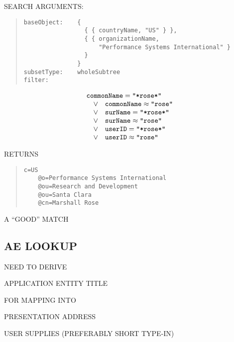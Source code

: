 \begin{bwslide}

\begin{nrtc}
\item	SEARCH ARGUMENTS:
\begin{quote}\small\begin{verbatim}
baseObject:    {
                 { { countryName, "US" } },
                 { { organizationName,
                     "Performance Systems International" }
                 }
               }
subsetType:    wholeSubtree
filter:
\end{verbatim}\end{quote}
\[\begin{array}{lll}
\multicolumn{3}{l}{\mbox{\tt commonName}=\mbox{\tt "*rose*"}}\\
&	\lor&	\mbox{\tt commonName}\approx\mbox{\tt "rose"}\\
&	\lor&	\mbox{\tt surName}=\mbox{\tt "*rose*"}\\
&	\lor&	\mbox{\tt surName}\approx\mbox{\tt "rose"}\\
&	\lor&	\mbox{\tt userID}=\mbox{\tt "*rose*"}\\
&	\lor&	\mbox{\tt userID}\approx\mbox{\tt "rose"}
\end{array}\]

\item	RETURNS
\begin{quote}\small\begin{verbatim}
c=US
    @o=Performance Systems International
    @ou=Research and Development
    @ou=Santa Clara
    @cn=Marshall Rose
\end{verbatim}\end{quote}
A ``GOOD'' MATCH
\end{nrtc}
\end{bwslide}


\begin{bwslide}
\part*	{AE LOOKUP}\bf

\begin{nrtc}
\item	NEED TO DERIVE
    \begin{nrtc}
    \item	APPLICATION ENTITY TITLE
    \end{nrtc}

\item	FOR MAPPING INTO
    \begin{nrtc}
    \item	PRESENTATION ADDRESS
    \end{nrtc}

\item	USER SUPPLIES (PREFERABLY SHORT TYPE-IN)
\end{nrtc}
\end{bwslide}


